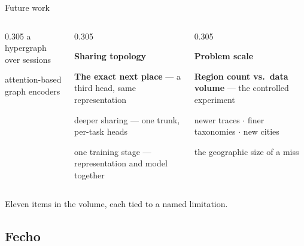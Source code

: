 \documentclass{beamer}
\begin{document}
\begin{frame}{Future work}
{\begin{columns}[t,onlytextwidth]
\begin{column}{0.305\textwidth}
            \smallskip a hypergraph over sessions\par
            \smallskip attention-based graph encoders
        \end{column}
        \hfill
        \begin{column}{0.305\textwidth}
            \raggedright
            {\color{primaryshade}\textbf{Sharing topology}}\par
            \vspace{0.6mm}{\color{primaryshade}\rule{\linewidth}{0.6pt}}\par\vspace{1.4mm}
            \textbf{The exact next place} --- a third head, same representation\par
            \smallskip deeper sharing --- one trunk, per-task heads\par
            \smallskip one training stage --- representation and model together
        \end{column}
        \hfill
        \begin{column}{0.305\textwidth}
            \raggedright
            {\color{primaryshade}\textbf{Problem scale}}\par
            \vspace{0.6mm}{\color{primaryshade}\rule{\linewidth}{0.6pt}}\par\vspace{1.4mm}
            \textbf{Region count vs.\ data volume} --- the controlled experiment\par
            \smallskip newer traces $\cdot$ finer taxonomies $\cdot$ new cities\par
            \smallskip the geographic size of a miss
        \end{column}
    \end{columns}\par}

    \vfill
    {\footnotesize Eleven items in the volume, each tied to a named limitation.\par}
\end{frame}

\subsection{Fecho}
\end{document}
